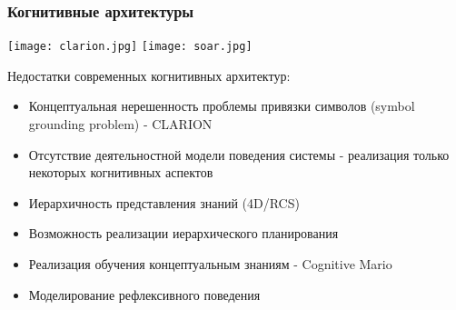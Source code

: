 	\begin{frame}
		\frametitle{Когнитивные архитектуры}
		\begin{center}
			\texttt{[image: clarion.jpg]}
			\texttt{[image: soar.jpg]}
		\end{center}
		\scriptsize
		Недостатки современных когнитивных архитектур:
		\begin{itemize}
			\item Концептуальная нерешенность проблемы привязки символов (symbol grounding problem) - CLARION
			\item Отсутствие деятельностной модели поведения системы - реализация только некоторых когнитивных аспектов
			\item Иерархичность представления знаний (4D/RCS)
			\item Возможность реализации иерархического планирования
			\item Реализация обучения концептуальным знаниям - Cognitive Mario
			\item Моделирование рефлексивного поведения
		\end{itemize}
		\vspace{-5pt}
		\nocite{*}
		\printbibliography[keyword={symbgrnd}, resetnumbers=true]
	\end{frame}